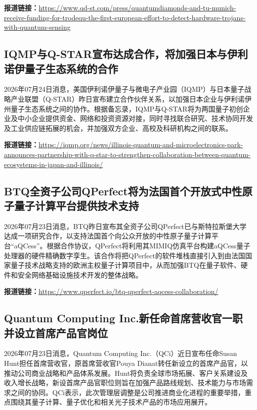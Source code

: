 \documentclass[12pt,a4paper]{ctexart}
\begin{document}
\noindent\textbf{报道链接：}\url{https://www.qd-st.com/press/quantumdiamonds-and-tu-munich-receive-funding-for-trodequ-the-first-european-effort-to-detect-hardware-trojans-with-quantum-sensing}

\subsection{ IQMP与Q-STAR宣布达成合作，将加强日本与伊利诺伊量子生态系统的合作 }

2026年07月24日消息，美国伊利诺伊量子与微电子产业园（IQMP）与日本量子战略产业联盟（Q-STAR）昨日宣布建立合作伙伴关系，以加强日本企业与伊利诺伊州量子生态系统之间的协作。根据备忘录，IQMP与Q-STAR将为两国量子初创企业及中小企业提供资金、网络和投资资源对接，同时寻找联合研究、技术协同开发及工业供应链拓展的机会，并加强双方企业、高校及科研机构之间的联系。

\noindent\textbf{报道链接：}\url{https://iqmp.org/news/illinois-quantum-and-microelectronics-park-announces-partnership-with-q-star-to-strengthen-collaboration-between-quantum-ecosystems-in-japan-and-illinois/}

\subsection{ BTQ全资子公司QPerfect将为法国首个开放式中性原子量子计算平台提供技术支持 }

2026年07月23日消息，BTQ昨日宣布其全资子公司QPerfect已与斯特拉斯堡大学达成一项研究合作，以支持法国首个向公众开放的中性原子量子计算平台“aQCess”。根据合作协议，QPerfect将利用其MIMIQ仿真平台构建aQCess量子处理器的硬件精确数字孪生。该合作将把QPerfect的软件堆栈直接引入到由法国国家量子技术战略支持的欧洲主权量子计算项目中，从而加强BTQ在量子软件、硬件和安全网络基础设施技术开发的整体战略。

\noindent\textbf{报道链接：}\url{https://www.qperfect.io/btq-qperfect-aqcess-collaboration/}

\subsection{ Quantum Computing Inc.新任命首席营收官一职并设立首席产品官岗位 }

2026年07月23日消息，Quantum Computing Inc.（QCi）近日宣布任命Susan Hunt担任首席营收官，原首席营收官Pouya Dianat转任新设立的首席产品官，以推动公司商业战略和产品体系发展。Hunt将负责全球市场拓展、客户关系建设及收入增长战略，新设首席产品官职位则旨在加强产品路线规划、技术能力与市场需求之间的协同。QCi表示，此次管理层调整是公司推进商业化进程的重要举措，重点围绕其量子计算、量子优化和相关光子技术产品的市场应用展开。
\end{document}
